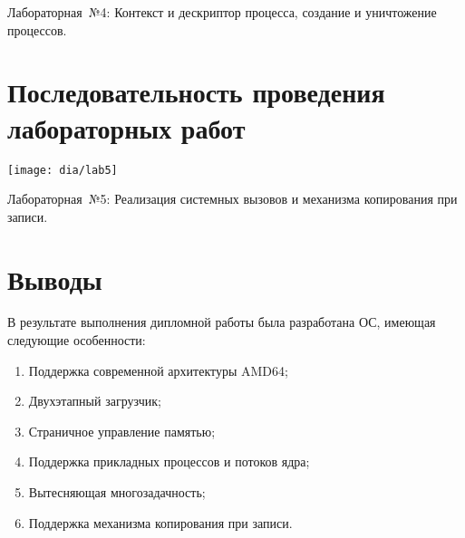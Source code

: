 \documentclass[12pt]{article}
\begin{document}
Лабораторная~№4: Контекст и дескриптор процесса, создание и уничтожение процессов.

\section{\textbf{Последовательность проведения лабораторных работ}}
\begin{center}
\texttt{[image: dia/lab5]}
\end{center}

Лабораторная~№5: Реализация системных вызовов и механизма копирования при записи.

\section{\textbf{Выводы}}
В результате выполнения дипломной работы была разработана ОС,
имеющая следующие особенности:

\begin{enumerate}
\item Поддержка современной архитектуры AMD64;
\item Двухэтапный загрузчик;
\item Страничное управление памятью;
\item Поддержка прикладных процессов и потоков ядра;
\item Вытесняющая многозадачность;
\item Поддержка механизма копирования при записи.
\end{enumerate}
\end{document}
